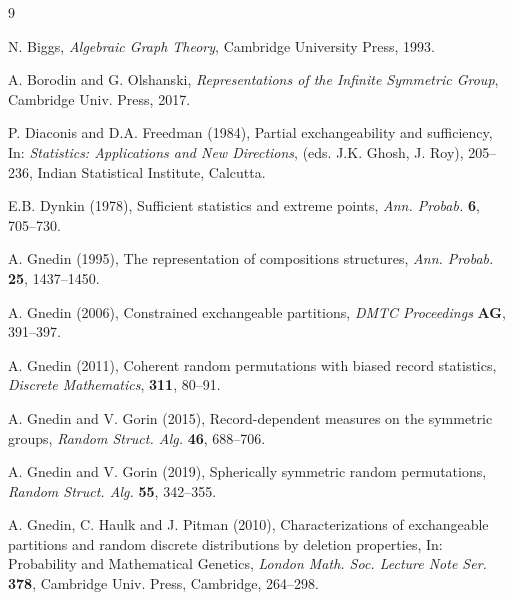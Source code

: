\documentclass{article}
\begin{document}
\begin{thebibliography}{9}



  N. Biggs, {\it Algebraic Graph Theory}, Cambridge University Press, 1993.

  A. Borodin and G. Olshanski, \emph{Representations of the Infinite Symmetric Group}, Cambridge Univ. Press, 2017.


 P. Diaconis and D.A. Freedman (1984), Partial exchangeability and sufficiency, In: {\it Statistics: Applications and New Directions}, (eds. J.K. Ghosh, J.  Roy), 205--236,
Indian Statistical Institute, Calcutta.



  E.B. Dynkin (1978), Sufficient statistics and extreme points, {\it  Ann. Probab.} {\bf 6}, 705--730. 




 A. Gnedin (1995), The representation of compositions structures, {\it Ann. Probab.} {\bf 25}, 1437--1450.

  A. Gnedin (2006), Constrained exchangeable partitions, {\it DMTC Proceedings} {\bf AG}, 391--397.

 A. Gnedin (2011), Coherent random permutations with biased record statistics,
{\it Discrete Mathematics},
{\bf 311}, 80--91.

 A. Gnedin and V. Gorin (2015), Record-dependent measures on the symmetric groups,  {\it Random Struct.   Alg.}  {\bf 46}, 688--706. 

 A. Gnedin and V. Gorin  (2019), Spherically symmetric 
 random permutations, {\it Random Struct. Alg.} {\bf 55}, 342--355. 


A. Gnedin, C. Haulk and J. Pitman (2010), 
Characterizations of exchangeable partitions and random discrete distributions by deletion properties, In: Probability and Mathematical
Genetics, {\it London Math. Soc. Lecture Note Ser.} {\bf  378}, Cambridge Univ. Press, Cambridge, 264--298.



\end{thebibliography}
\end{document}
